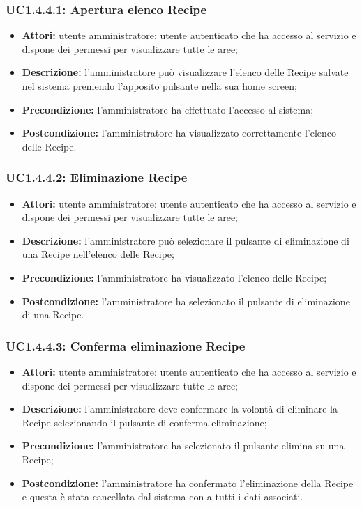 \subsubsection{UC1.4.4.1: Apertura elenco Recipe}

\begin{itemize}
  	\item \textbf{Attori:} utente amministratore: utente autenticato che ha accesso al servizio e dispone dei permessi per visualizzare tutte le aree;
    \item \textbf{Descrizione:} l'amministratore può visualizzare l'elenco delle Recipe salvate nel sistema premendo l'apposito pulsante nella sua home screen;
    \item \textbf{Precondizione:} l'amministratore ha effettuato l'accesso al sistema;
    \item \textbf{Postcondizione:} l'amministratore ha visualizzato correttamente l'elenco delle Recipe.
\end{itemize}

\subsubsection{UC1.4.4.2: Eliminazione Recipe}

\begin{itemize}
  	\item \textbf{Attori:} utente amministratore: utente autenticato che ha accesso al servizio e dispone dei permessi per visualizzare tutte le aree;
    \item \textbf{Descrizione:} l'amministratore può selezionare il pulsante di eliminazione di una Recipe nell'elenco delle Recipe;
    \item \textbf{Precondizione:} l'amministratore ha visualizzato l'elenco delle Recipe;
    \item \textbf{Postcondizione:} l'amministratore ha selezionato il pulsante di eliminazione di una Recipe.
\end{itemize}
\subsubsection{UC1.4.4.3: Conferma eliminazione Recipe}

\begin{itemize}
  	\item \textbf{Attori:} utente amministratore: utente autenticato che ha accesso al servizio e dispone dei permessi per visualizzare tutte le aree;
    \item \textbf{Descrizione:} l'amministratore deve confermare la volontà di eliminare la Recipe selezionando il pulsante di conferma eliminazione;
    \item \textbf{Precondizione:} l'amministratore ha selezionato il pulsante elimina su una Recipe;
    \item \textbf{Postcondizione:} l'amministratore ha confermato l'eliminazione della Recipe e questa è stata cancellata dal sistema con a tutti i dati associati.
\end{itemize}

